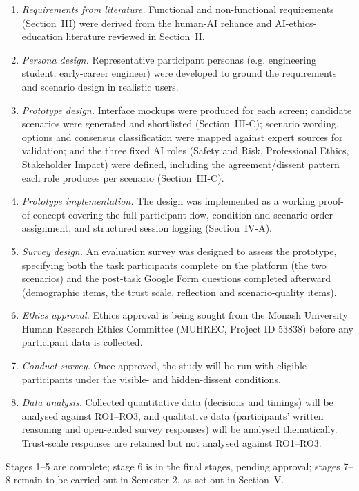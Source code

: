 \documentclass[conference]{IEEEtran}
\begin{document}
\begin{enumerate}
    \item \textit{Requirements from literature.} Functional and non-functional requirements (Section~III) were derived from the human-AI reliance and AI-ethics-education literature reviewed in Section~II.
    \item \textit{Persona design.} Representative participant personas (e.g. engineering student, early-career engineer) were developed to ground the requirements and scenario design in realistic users.
    \item \textit{Prototype design.} Interface mockups were produced for each screen; candidate scenarios were generated and shortlisted (Section~III-C); scenario wording, options and consensus classification were mapped against expert sources for validation; and the three fixed AI roles (Safety and Risk, Professional Ethics, Stakeholder Impact) were defined, including the agreement/dissent pattern each role produces per scenario (Section~III-C).
    \item \textit{Prototype implementation.} The design was implemented as a working proof-of-concept covering the full participant flow, condition and scenario-order assignment, and structured session logging (Section~IV-A).
    \item \textit{Survey design.} An evaluation survey was designed to assess the prototype, specifying both the task participants complete on the platform (the two scenarios) and the post-task Google Form questions completed afterward (demographic items, the trust scale, reflection and scenario-quality items).
    \item \textit{Ethics approval.} Ethics approval is being sought from the Monash University Human Research Ethics Committee (MUHREC, Project ID 53838) before any participant data is collected.
    \item \textit{Conduct survey.} Once approved, the study will be run with eligible participants under the visible- and hidden-dissent conditions.
    \item \textit{Data analysis.} Collected quantitative data (decisions and timings) will be analysed against RO1--RO3, and qualitative data (participants' written reasoning and open-ended survey responses) will be analysed thematically. Trust-scale responses are retained but not analysed against RO1--RO3.
\end{enumerate}

Stages 1--5 are complete; stage 6 is in the final stages, pending approval; stages 7--8 remain to be carried out in Semester 2, as set out in Section~V.
\end{document}
